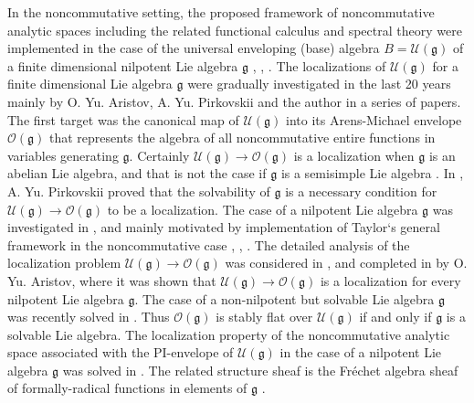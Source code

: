\documentclass[12pt,reqno]{amsart}%
\theoremstyle{plain}
\numberwithin{theorem}{section} \numberwithin{equation}{section}
\numberwithin{lemma}{section}
\numberwithin{remark}{section}
\numberwithin{example}{section}
\numberwithin{proposition}{section}
\numberwithin{definition}{section}
\numberwithin{corollary}{section}
\begin{document}
In the noncommutative setting, the proposed framework of noncommutative
analytic spaces including the related functional calculus and spectral theory
were implemented in the case of the universal enveloping (base) algebra
$B=\mathcal{U}\left(  \mathfrak{g}\right)  $ of a finite dimensional nilpotent
Lie algebra $\mathfrak{g}$ \cite{DosiIzv09}, \cite{DosiAC}, \cite{DosJOT10}.
The localizations of $\mathcal{U}\left(  \mathfrak{g}\right)  $ for a finite
dimensional Lie algebra $\mathfrak{g}$ were gradually investigated in the last
20 years mainly by O. Yu. Aristov, A. Yu. Pirkovskii and the author in a
series of papers. The first target was the canonical map of $\mathcal{U}%
\left(  \mathfrak{g}\right)  $ into its Arens-Michael envelope $\mathcal{O}%
\left(  \mathfrak{g}\right)  $ that represents the algebra of all
noncommutative entire functions in variables generating $\mathfrak{g}$.
Certainly $\mathcal{U}\left(  \mathfrak{g}\right)  \rightarrow\mathcal{O}%
\left(  \mathfrak{g}\right)  $ is a localization when $\mathfrak{g}$ is an
abelian Lie algebra, and that is not the case if $\mathfrak{g}$ is a
semisimple Lie algebra \cite{Tay2}. In \cite{Pir16}, A. Yu. Pirkovskii proved
that the solvability of $\mathfrak{g}$ is a necessary condition for
$\mathcal{U}\left(  \mathfrak{g}\right)  \rightarrow\mathcal{O}\left(
\mathfrak{g}\right)  $ to be a localization. The case of a nilpotent Lie
algebra $\mathfrak{g}$ was investigated in \cite{Dosi2003}, \cite{DosiMS10}
and \cite{DosiK} mainly motivated by implementation of Taylor`s general
framework in the noncommutative case \cite{Dos}, \cite{DosCS}, \cite{DosJOT10}%
. The detailed analysis of the localization problem $\mathcal{U}\left(
\mathfrak{g}\right)  \rightarrow\mathcal{O}\left(  \mathfrak{g}\right)  $ was
considered in \cite{PirSF}, and completed in \cite{Aris20} by O. Yu. Aristov,
where it was shown that $\mathcal{U}\left(  \mathfrak{g}\right)
\rightarrow\mathcal{O}\left(  \mathfrak{g}\right)  $ is a localization for
every nilpotent Lie algebra $\mathfrak{g}$. The case of a non-nilpotent but
solvable Lie algebra $\mathfrak{g}$ was recently solved in \cite{Aris25}. Thus
$\mathcal{O}\left(  \mathfrak{g}\right)  $ is stably flat over $\mathcal{U}%
\left(  \mathfrak{g}\right)  $ if and only if $\mathfrak{g}$ is a solvable Lie
algebra. The localization property of the noncommutative analytic space
associated with the PI-envelope of $\mathcal{U}\left(  \mathfrak{g}\right)  $
in the case of a nilpotent Lie algebra $\mathfrak{g}$ was solved in
\cite{DosiAC}. The related structure sheaf is the Fr\'{e}chet algebra sheaf of
formally-radical functions in elements of $\mathfrak{g}$ \cite{DosJOT10}.
\end{document}
